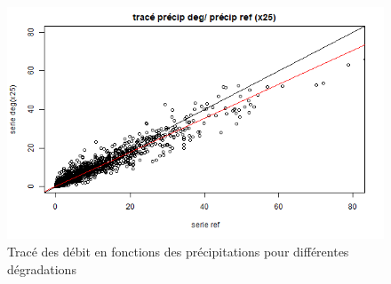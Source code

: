 \documentclass[a4paper,11pt]{article}
\begin{document}
\begin{figure}[!h]
\begin{minipage}[b]{0.48\linewidth}
	\end{minipage}\hfill
	\begin{minipage}[b]{0.48\linewidth}	
		\centering \includegraphics[scale=0.4]{images/pr_2_dg.png}
	\end{minipage}
	\caption{Tracé des débit en fonctions des précipitations pour différentes dégradations}
\end{figure}
\end{document}
